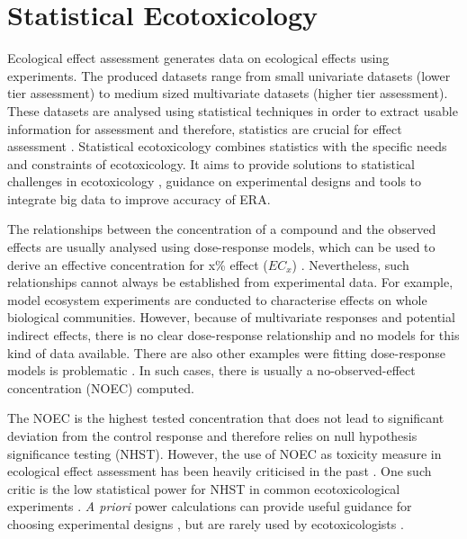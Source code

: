 

\section{Statistical Ecotoxicology}
Ecological effect assessment generates data on ecological effects using experiments. 
The produced datasets range from small univariate datasets (lower tier assessment) to medium sized multivariate datasets (higher tier assessment).
These datasets are analysed using statistical techniques in order to extract usable information for assessment and therefore, statistics are crucial for effect assessment \citep{newman_quantitative_2012}.
Statistical ecotoxicology combines statistics with the specific needs and constraints of ecotoxicology. 
It aims to provide solutions to statistical challenges in ecotoxicology \citep{fox_comment_2016}, guidance on experimental designs \citep{johnson_power_2015} and tools to integrate big data \citep {van_den_brink_new_2016} to improve accuracy of ERA. 

The relationships between the concentration of a compound and the observed effects are usually analysed using dose-response models, which can be used to derive an effective concentration for x\% effect ($EC_{x}$) \citep{ritz_toward_2010}. 
Nevertheless, such relationships cannot always be established from experimental data.
For example, model ecosystem experiments are conducted to characterise effects on whole biological communities.
However, because of multivariate responses and potential indirect effects, there is no clear dose-response relationship and no models for this kind of data available. 
There are also other examples were fitting dose-response models is problematic \citep{green_issues_2016}. 
In such cases, there is usually a no-observed-effect concentration (NOEC) computed. 

The NOEC is the highest tested concentration that does not lead to significant deviation from the control response and therefore relies on null hypothesis significance testing (NHST). 
However, the use of NOEC as toxicity measure in ecological effect assessment has been heavily criticised in the past \citep{laskowski_good_1995, chapman_warning:_1996, warne_noec_2008, fox_what_2012, jager_bad_2012, fox_dont_2016}. 
One such critic is the low statistical power for NHST in common ecotoxicological experiments \citep{van_der_hoeven_power_1998}.
\emph{A priori} power calculations can provide useful guidance for choosing experimental designs \citep{johnson_power_2015}, but are rarely used by ecotoxicologists \citep{newman_what_2008}. 

